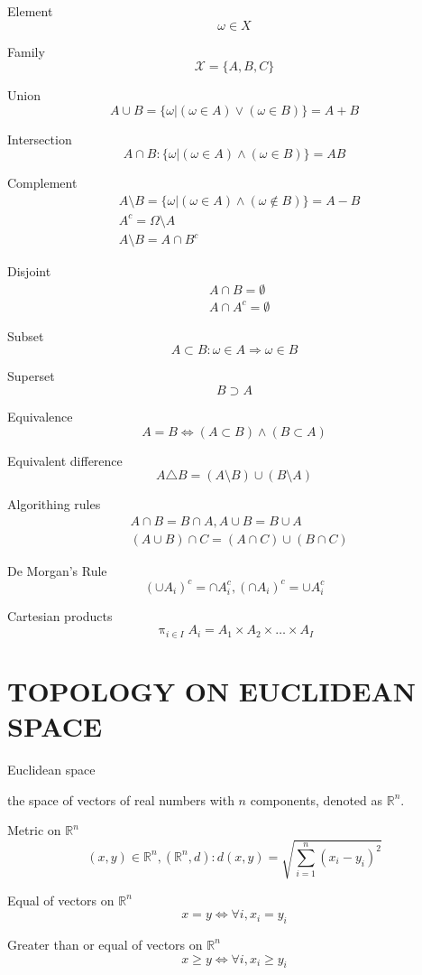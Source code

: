 \documentclass{article}
\begin{document}
Element
$$\omega \in X$$

Family
$$\mathscr{X}=\{A,B,C\}$$

Union
$$A\cup B=\{\omega|(\omega\in A) \lor (\omega \in B)\}=A+B$$

Intersection
$$A \cap B:\{\omega|(\omega\in A) \land (\omega \in B)\}=AB$$

Complement
\begin{align}
&A\setminus B=\{\omega|(\omega\in A) \land (\omega \notin B)\}=A-B
\\&A^{c}=\Omega \setminus A
\\&A\setminus B=A\cap B^{c}
\end{align}

Disjoint
\begin{align}
&A\cap B= \emptyset
\\& A \cap A^{c}=\emptyset
\end{align}

Subset
$$A \subset B:\omega\in A \Rightarrow \omega \in B$$

Superset
$$B \supset A$$

Equivalence
$$A=B \iff (A \subset B) \land (B \subset A)$$

Equivalent difference
$$A \triangle B=(A\setminus B)\cup (B\setminus A)$$

Algorithing rules
\begin{align}
&A\cap B=B\cap A,A\cup B=B\cup A
\\&(A\cup B)\cap C=(A\cap C)\cup(B\cap C)
\end{align}

De Morgan's Rule
$$(\cup A_{i})^{c}=\cap A_{i}^{c},(\cap A_{i})^{c}=\cup A_{i}^{c}$$

Cartesian products
$$\mathop{\pi}_{i\in I} A_{i}=A_{1}\times A_{2} \times \dots \times A_{I}$$

\newpage
\section{TOPOLOGY ON EUCLIDEAN SPACE}
Euclidean space

the space of vectors of real numbers with $n$ components, denoted as $\mathbb{R}^n$.

Metric on $\mathbb{R}^n$
$$(x,y)\in \mathbb{R}^{n},(\mathbb{R}^{n},d):d(x,y)=\sqrt{\sum\limits_{i=1}^{n}(x_{i}-y_{i})^{2}}$$


Equal of vectors  on $\mathbb{R}^n$
$$x=y\iff \forall i,x_{i}=y_{i}$$

Greater than or equal of vectors on $\mathbb{R}^n$
$$ x \geqslant y \iff \forall i, x_{i} \geqslant y_{i}$$
\end{document}
